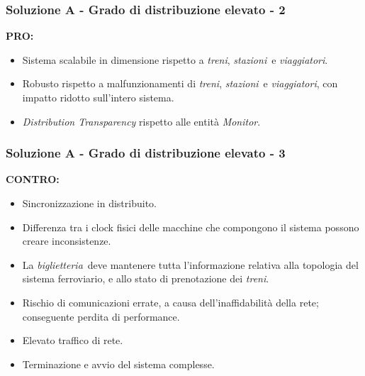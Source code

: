 \documentclass[slidestop,compress,blackandwhite]{beamer}
\newcommand{\ii}[1]{\textit{#1}}
\newcommand{\treni}{\ii{treni}}
\newcommand{\viaggiatori}{\ii{viaggiatori}}
\newcommand{\stazioni}{\ii{stazioni}}
\newcommand{\biglietteria}{\ii{biglietteria}}
\newcommand{\PRO}{\textbf{PRO:}}
\newcommand{\CONTRO}{\textbf{CONTRO:}}
\begin{document}
	\begin{frame}
		\frametitle{Soluzione A - Grado di distribuzione elevato - 2}
		\PRO
			\begin{itemize}
				\item Sistema scalabile in dimensione rispetto a \treni, \stazioni~e \viaggiatori.
				\item Robusto rispetto a malfunzionamenti di \treni, \stazioni~e \viaggiatori, con impatto ridotto sull'intero sistema.
				\item \ii{Distribution Transparency} rispetto alle entità \ii{Monitor}.
			\end{itemize}
		
	\end{frame}

	\begin{frame}
		\frametitle{Soluzione A - Grado di distribuzione elevato - 3}
		\CONTRO
			\begin{itemize}
				\item Sincronizzazione in distribuito.
				\item Differenza tra i clock fisici delle macchine che compongono il sistema possono creare inconsistenze.
				\item La \biglietteria~deve mantenere tutta l'informazione relativa alla topologia del sistema ferroviario, e allo stato di prenotazione dei \treni.
				\item Rischio di comunicazioni errate, a causa dell'inaffidabilità della rete; conseguente perdita di performance. 
				\item Elevato traffico di rete.
				\item Terminazione e avvio del sistema complesse.
			\end{itemize}
		
	\end{frame}
	
\end{document}

